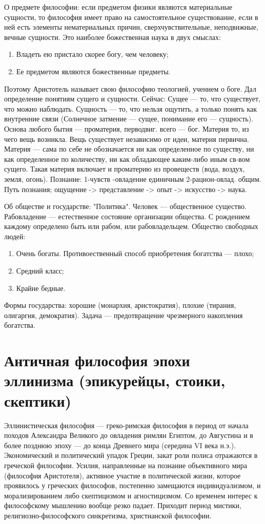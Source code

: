 \documentclass[12pt]{article}
\begin{document}
О предмете философии: если предметом физики являются материальные сущности,
то философия имеет право на самостоятельное
существование, если в ней есть элементы нематериальных причин, сверхчувствительные,
неподвижные, вечные сущности.
Это наиболее божественная наука в двух смыслах:
\begin{enumerate}
  \item Владеть ею пристало скорее богу, чем человеку;
  \item Ее предметом являются божественные предметы.
\end{enumerate}
Поэтому Аристотель называет свою философию теологией, учением о боге.
Дал определение понятиям сущего и сущности.
Сейчас: Сущее --- то, что существует, что можно наблюдать. Сущность --- то, что нельзя ощутить,
а только понять
как внутренние связи (Солнечное  затмение --- сущее, понимание его --- сущность). 
Основа  любого  бытия ---  проматерия,
перводвиг. всего --- бог. Материя то, из чего вещь возникла. Вещь существует независимо от идеи, материя
первична. Материя --- сама по себе не обозначается ни как определенное по существу, ни как определенное по
количеству, ни как обладающее каким-либо иным св-вом сущего. Такая материя включает и проматерию из
провеществ (вода, воздух, земля, огонь).
Познание: 1-чувств -овладение единичным 2-рацион-овлад. общим. 
Путь познания; ощущение -> представление -> опыт -> искусство -> наука.

Об обществе и государстве: "Политика".
Человек --- общественное существо. Рабовладение --- естественное состояние организации
общества. С рождением каждому определено быть или рабом, или рабовладельцем.
Общество свободных людей:
\begin{enumerate}
  \item Очень богаты. Противоественный способ приобретения богатства --- плохо; 
\item Средний класс;
\item Крайне бедные.
\end{enumerate}
Формы государства: хорошие (монархия, аристократия), плохие (тирания, олигаргия, демократия).
Задача --- предотвращение чрезмерного накопления богатства.

\newpage
\section{Античная философия эпохи эллинизма (эпикурейцы, стоики, скептики)}
Эллинистическая философия --- греко-римская философия в период от начала походов Александра Великого
до овладения
римлян Египтом, до Августина и в более позднюю эпоху --- до конца Древнего мира (середина VI века н.э.). 
Экономический и политический
упадок Греции, закат роли полиса отражаются в греческой философии. Усилия, направленные на
познание объективного мира (философия Аристотеля), активное участие в политической жизни,
которое проявилось у греческих философов,
постепенно  замещаются  индивидуализмом,  и  морализированием  либо  скептицизмом  и  агностицизмом.  Со
временем интерес к философскому мышлению вообще резко падает. Приходит период мистики,
религиозно-философского синкретизма, христианской философии. 
\end{document}
